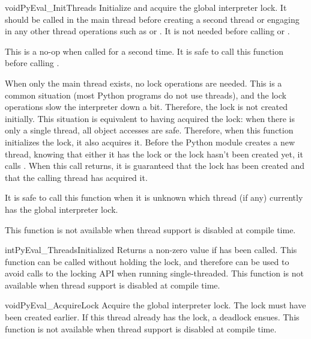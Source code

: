 \begin{cfuncdesc}{void}{PyEval_InitThreads}{}
  Initialize and acquire the global interpreter lock.  It should be
  called in the main thread before creating a second thread or
  engaging in any other thread operations such as
   or
  .
  It is not needed before calling
   or
  .

  This is a no-op when called for a second time.  It is safe to call
  this function before calling
  .

  When only the main thread exists, no lock operations are needed.
  This is a common situation (most Python programs do not use
  threads), and the lock operations slow the interpreter down a bit.
  Therefore, the lock is not created initially.  This situation is
  equivalent to having acquired the lock:  when there is only a single
  thread, all object accesses are safe.  Therefore, when this function
  initializes the lock, it also acquires it.  Before the Python
   module creates a new thread,
  knowing that either it has the lock or the lock hasn't been created
  yet, it calls .  When this call
  returns, it is guaranteed that the lock has been created and that the
  calling thread has acquired it.

  It is  safe to call this function when it is unknown
  which thread (if any) currently has the global interpreter lock.

  This function is not available when thread support is disabled at
  compile time.
\end{cfuncdesc}

\begin{cfuncdesc}{int}{PyEval_ThreadsInitialized}{}
  Returns a non-zero value if  has been
  called.  This function can be called without holding the lock, and
  therefore can be used to avoid calls to the locking API when running
  single-threaded.  This function is not available when thread support
  is disabled at compile time. 
\end{cfuncdesc}

\begin{cfuncdesc}{void}{PyEval_AcquireLock}{}
  Acquire the global interpreter lock.  The lock must have been
  created earlier.  If this thread already has the lock, a deadlock
  ensues.  This function is not available when thread support is
  disabled at compile time.
\end{cfuncdesc}

